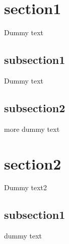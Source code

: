 \documentclass{article}
\begin{document}
  \tableofcontents
  \newpage
  \section{section1}  
   Dummy text
  \subsection{subsection1}
   Dummy text
  \subsection{subsection2}
   more dummy text
  \section{section2}
   Dummy text2
  \subsection{subsection1}
   dummy text
\end{document}
